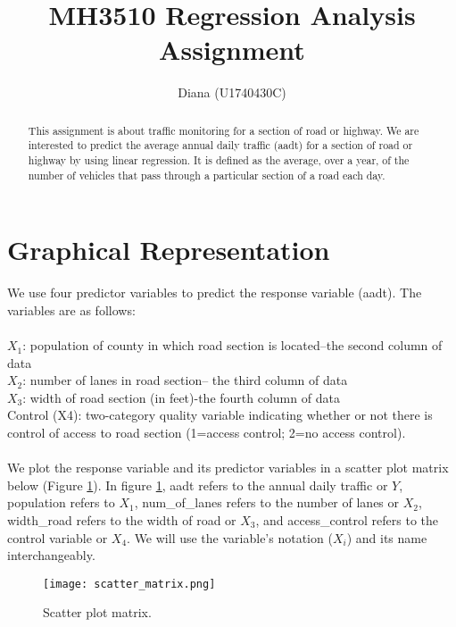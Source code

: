 \documentclass[english]{article}
\begin{document}
\tableofcontents

\title{MH3510 Regression Analysis Assignment}

\author{
  Diana (U1740430C)
}

\maketitle

\begin{abstract}
  This assignment is about traffic monitoring for a section of road or highway. We are interested to predict the average annual daily traffic (aadt) for a section of road or highway by using linear regression. It is defined as the average, over a year, of the number of vehicles that pass through a particular section of a road each day.
\end{abstract}

\section{Graphical Representation}\label{introduction}
We use four predictor variables to predict the response variable (aadt). The variables are as follows: \\ \\
$X_1$: population of county in which road section is located--the second column of data \\ 
$X_2$: number of lanes in road section-- the third  column of data \\
$X_3$: width of road section (in feet)-the fourth column of data \\
Control (X4): two-category quality variable indicating whether or not there is control of access to road section (1=access control; 2=no access control). \\ \\
We plot the response variable and its predictor variables in a scatter plot matrix below (Figure \ref{figure1}). In figure \ref{figure1}, aadt refers to the annual daily traffic or $Y$, population refers to $X_1$, num\_of\_lanes refers to the number of lanes or $X
_2$, width\_road refers to the width of road or $X_3$, and access\_control refers to the control variable or $X_4$. We will use the variable's notation ($X_i$) and its name interchangeably.  

\begin{figure}[H]
	\begin{centering}
  		\texttt{[image: scatter\_matrix.png]}
  		\caption{Scatter plot matrix.\label{figure1}
}
	\end{centering}
\end{figure}
\end{document}

